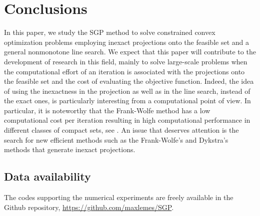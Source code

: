 

\chapter{Conclusions} \label{chap:Conclusions}
In this paper, we study the SGP method  to solve   constrained convex optimization problems employing  inexact projections onto the feasible set and a general nonmonotone  line search. We expect that this paper will contribute to the development of research in this field, mainly to solve large-scale problems when the computational effort of an iteration is associated with the projections onto the feasible set and  the cost of evaluating the objective function. Indeed, the idea of using the inexactness in the projection as well as in the line search,   instead of the exact ones, is particularly interesting from a computational point of view. In particular,   it is noteworthy that the Frank-Wolfe method  has a low computational cost per iteration  resulting in high computational performance in different classes of compact sets, see \cite{GarberHazan2015, Jaggi2013}.  An issue that deserves attention is the search for new efficient methods such as the Frank-Wolfe's and Dykstra's  methods that generate inexact projections.


\section*{Data availability} 
The codes supporting the numerical experiments are freely available in the Github repository, \url{https://github.com/maxlemes/SGP}.